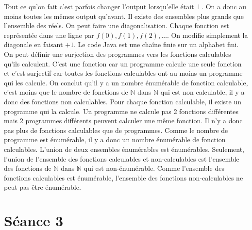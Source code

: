 \begin{mcqs}
  {Tout ce qu'on fait c'est parfois changer l'output lorsqu'elle était $\bot$. On a donc au moins toutes les mêmes output qu'avant.}
  {Il existe des ensembles plus grands que l’ensemble des réels.}
  {On peut faire une diagonalisation.
  Chaque fonction est représentée dans une ligne par $f(0),f(1),f(2),\ldots$.
  On modifie simplement la diagonale en faisant $+1$.}
  {Le code Java est une chaîne finie sur un alphabet fini.}
  {On peut définir une surjection des programmes vers les fonctions calculables qu'ils calculent.
  C'est une fonction car un programme calcule une seule fonction et c'est surjectif car toutes les fonctions calculables
  ont au moins un programme qui les calcule.
  On conclut qu'il y a un nombre énumérable de fonction calculable, c'est moins que le nombre de fonctions de $\mathbb{N}$ dans $\mathbb{N}$
  qui est non calculable, il y a donc des fonctions non calculables.}
  {Pour chaque fonction calculable, il existe un programme qui la calcule.
  Un programme ne calcule pas 2 fonctions différentes mais 2 programmes différents peuvent calculer une même fonction.
  Il n'y a donc pas plus de fonctions calculables que de programmes.
  Comme le nombre de programme est énumérable,
  il y a donc un nombre énumérable de fonction calculables.}
  {L'union de deux ensembles énumérables est énumérables.
  Seulement, l'union de l'ensemble des fonctions calculables et non-calculables
  est l'ensemble des fonctions de $\mathbb{N}$ dans $\mathbb{N}$ qui est non-énumérable.
  Comme l'ensemble des fonctions calculables est énumérable,
  l'ensemble des fonctions non-calculables ne peut pas être énumérable.}
\end{mcqs}

\section*{Séance 3}


